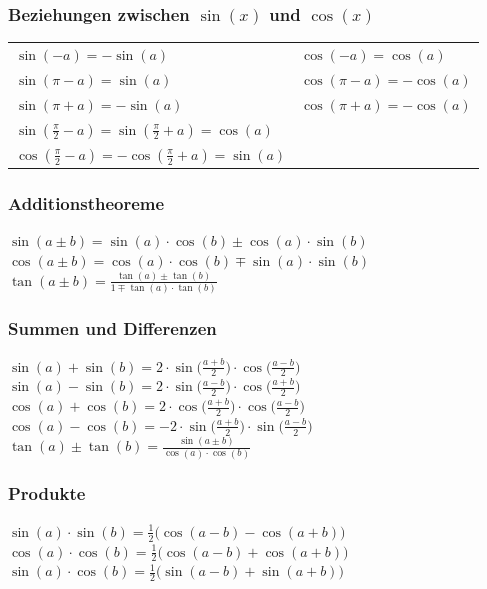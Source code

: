 		\subsubsection{Beziehungen zwischen $\sin(x)$ und $\cos(x)$}
		\begin{tabular}{ll}
		$\sin(-a) = -\sin(a)$ & $\cos(-a) = \cos(a)$ \\
		$\sin(\pi - a) = \sin(a)$ & $\cos(\pi -a) = - \cos(a)$ \\		
		$\sin(\pi + a) = -\sin(a)$ & $\cos(\pi + a) = - \cos(a)$ \\	
		$\sin(\frac{\pi}{2} - a) = \sin(\frac{\pi}{2} + a) = \cos(a)$ \\
		$\cos(\frac{\pi}{2} - a) = - \cos(\frac{\pi}{2} + a) = \sin(a)$\\		 
		\end{tabular}
		
		

		\subsubsection{Additionstheoreme}
		
		$\sin(a \pm b) = \sin(a) \cdot \cos(b) \pm \cos(a) \cdot \sin(b)$ \\
		$\cos(a \pm b) = \cos(a) \cdot \cos(b) \mp \sin(a) \cdot \sin(b) $ \\
		$\tan(a \pm b) = \frac{\tan(a) \pm \tan(b)}{1 \mp \tan(a) \cdot \tan(b)}$
		
	
		\subsubsection{Summen und Differenzen}
		
		$\sin(a) + \sin(b) = 2 \cdot \sin \big( \frac{a+b}{2} \big) \cdot \cos \big( \frac{a-b}{2} \big)$ \\
		$\sin(a) - \sin(b) = 2 \cdot \sin \big( \frac{a-b}{2} \big) \cdot \cos \big( \frac{a+b}{2} \big)$ \\
		$\cos(a) + \cos(b) = 2 \cdot \cos \big( \frac{a+b}{2} \big) \cdot \cos \big( \frac{a-b}{2} \big)$ \\
		$\cos(a) - \cos(b) = -2 \cdot \sin \big( \frac{a+b}{2} \big) \cdot \sin \big( \frac{a-b}{2} \big)$ \\
		$\tan(a) \pm \tan(b) = \frac{\sin(a \pm b)}{\cos(a) \cdot \cos(b)}$ 
		
			
		
		\subsubsection{Produkte}
		$\sin(a) \cdot \sin(b) = \frac{1}{2} \big( \cos(a-b) - \cos(a+b) \big) $ \\
		$\cos(a) \cdot \cos(b) = \frac{1}{2} \big( \cos(a-b) + \cos(a+b) \big) $ \\	
		$\sin(a) \cdot \cos(b) = \frac{1}{2} \big( \sin(a-b) + \sin(a+b) \big) $ 
			
